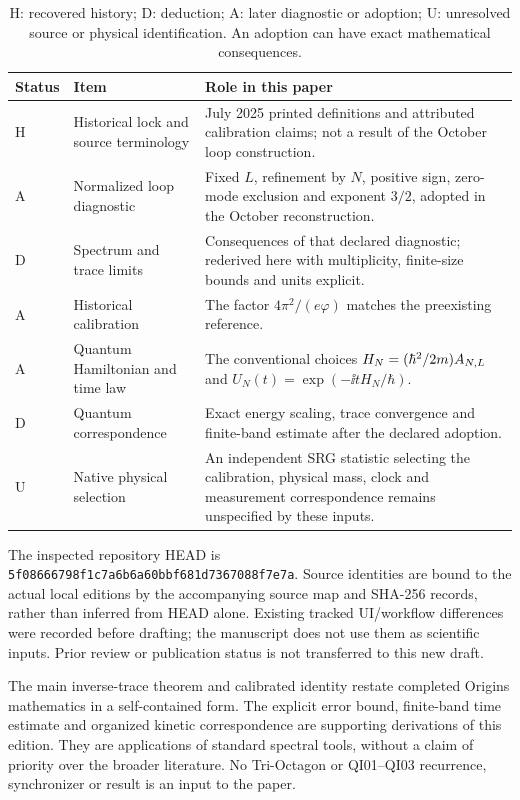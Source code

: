 \documentclass[11pt,a4paper]{article}
\theoremstyle{definition}\newtheorem{definition}[theorem]{Definition}
\theoremstyle{remark}\newtheorem{remark}[theorem]{Remark}
\numberwithin{equation}{section}
\begin{document}
\begin{table}[ht]
\small
\centering
\begin{tabularx}{\textwidth}{@{}p{11mm}>{\raggedright\arraybackslash}p{40mm}>{\raggedright\arraybackslash}X@{}}
\toprule
Status & Item & Role in this paper\\
\midrule
H & Historical lock and source terminology &
July 2025 printed definitions and attributed calibration claims;
not a result of the October loop construction.\\
A & Normalized loop diagnostic &
Fixed \(L\), refinement by \(N\), positive sign, zero-mode exclusion
and exponent \(3/2\), adopted in the October reconstruction.\\
D & Spectrum and trace limits &
Consequences of that declared diagnostic; rederived here with
multiplicity, finite-size bounds and units explicit.\\
A & Historical calibration &
The factor \(4\pi^2/(e\varphi)\) matches the preexisting reference.\\
A & Quantum Hamiltonian and time law &
The conventional choices \(H_N=(\hbar^2/2m)A_{N,L}\) and
\(U_N(t)=\exp(-\ii tH_N/\hbar)\).\\
D & Quantum correspondence &
Exact energy scaling, trace convergence and finite-band estimate
after the declared adoption.\\
U & Native physical selection &
An independent SRG statistic selecting the calibration,
physical mass, clock and measurement correspondence remains
unspecified by these inputs.\\
\bottomrule
\end{tabularx}
\caption{H: recovered history; D: deduction; A: later diagnostic or
adoption; U: unresolved source or physical identification.
An adoption can have exact mathematical consequences.}
\label{tab:status}
\end{table}

The inspected repository HEAD is
\texttt{5f08666798f1c7a6b6a60bbf681d7367088f7e7a}.
Source identities are bound to the actual local editions by the
accompanying source map and SHA-256 records, rather than inferred from
HEAD alone. Existing tracked UI/workflow differences were recorded
before drafting; the manuscript does not use them as scientific inputs.
Prior review or publication status is not transferred to this new draft.

The main inverse-trace theorem and calibrated identity restate completed
Origins mathematics in a self-contained form. The explicit error bound,
finite-band time estimate and organized kinetic correspondence are
supporting derivations of this edition. They are applications of standard
spectral tools, without a claim of priority over the broader literature.
No Tri-Octagon or QI01--QI03 recurrence, synchronizer or result is an
input to the paper.
\end{document}
